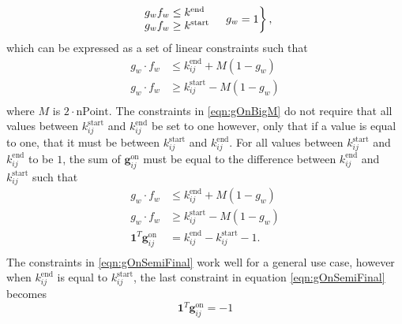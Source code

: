 \begin{equation}\label{eqn:gOnCases}\begin{aligned}
	\begin{rcases}
		\begin{array}{ll}
			g_w f_w \le k^{\text{end}}  \\
			g_w f_w \ge k^{\text{start}}\\ 
		\end{array} & g_w = 1 \\
	\end{rcases},
\end{aligned} \end{equation}
which can be expressed as a set of linear constraints such that
\begin{equation} \label{eqn:gOnBigM}\begin{aligned}
	g_w\cdot f_w &\le k^{\text{end}}_{ij} + M(1 - g_w) \\
	g_w\cdot f_w &\ge k^{\text{start}}_{ij} - M(1 - g_w) \\ 
\end{aligned} \end{equation}
where $M$ is $2\cdot\text{nPoint}$. The constraints in \eqref{eqn:gOnBigM} do not require that all values between $k_{ij}^{\text{start}}$ and $k_{ij}^{\text{end}}$ be set to one however, only that if a value is equal to one, that it must be between $k_{ij}^{\text{start}}$ and $k_{ij}^{\text{end}}$. For all values between  $k_{ij}^{\text{start}}$ and $k_{ij}^{\text{end}}$ to be $1$, the sum of $\mathbf{g}_{ij}^{\text{on}}$ must be equal to the difference between $k_{ij}^{\text{end}}$ and $k_{ij}^{\text{start}}$ such that 
\begin{equation} \label{eqn:gOnSemiFinal}\begin{aligned}
	g_w\cdot f_w &\le k^{\text{end}}_{ij} + M(1 - g_w) \\
	g_w\cdot f_w &\ge k^{\text{start}}_{ij} - M(1 - g_w) \\ 
	\mathbf{1}^T\mathbf{g}_{ij}^{\text{on}} &= k_{ij}^{\text{end}} - k_{ij}^{\text{start}} - 1.\\
\end{aligned} \end{equation}
The constraints in \eqref{eqn:gOnSemiFinal} work well for a general use case, however when $k_{ij}^{\text{end}}$ is equal to $k_{ij}^{\text{start}}$, the last constraint in equation \ref{eqn:gOnSemiFinal} becomes
\begin{equation}
	\mathbf{1}^T\mathbf{g}_{ij}^{\text{on}} = -1
\end{equation}
